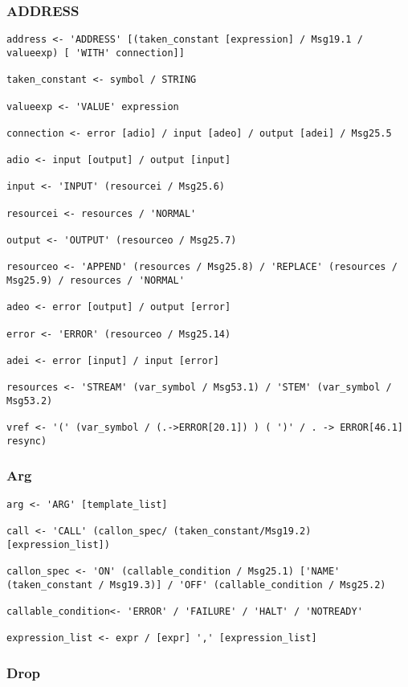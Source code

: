 \subsubsection{ADDRESS}

\begin{verbatim}
address <- 'ADDRESS' [(taken_constant [expression] / Msg19.1 / valueexp) [ 'WITH' connection]]

taken_constant <- symbol / STRING

valueexp <- 'VALUE' expression

connection <- error [adio] / input [adeo] / output [adei] / Msg25.5

adio <- input [output] / output [input]

input <- 'INPUT' (resourcei / Msg25.6)

resourcei <- resources / 'NORMAL'

output <- 'OUTPUT' (resourceo / Msg25.7)

resourceo <- 'APPEND' (resources / Msg25.8) / 'REPLACE' (resources / Msg25.9) / resources / 'NORMAL'

adeo <- error [output] / output [error]

error <- 'ERROR' (resourceo / Msg25.14)

adei <- error [input] / input [error]

resources <- 'STREAM' (var_symbol / Msg53.1) / 'STEM' (var_symbol / Msg53.2)

vref <- '(' (var_symbol / (.->ERROR[20.1]) ) ( ')' / . -> ERROR[46.1] resync)
\end{verbatim}

\subsubsection{Arg}

\begin{verbatim}
arg <- 'ARG' [template_list]

call <- 'CALL' (callon_spec/ (taken_constant/Msg19.2)[expression_list])

callon_spec <- 'ON' (callable_condition / Msg25.1) ['NAME' (taken_constant / Msg19.3)] / 'OFF' (callable_condition / Msg25.2)

callable_condition<- 'ERROR' / 'FAILURE' / 'HALT' / 'NOTREADY'

expression_list <- expr / [expr] ',' [expression_list]
\end{verbatim}

\subsubsection{Drop}

